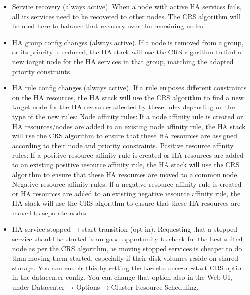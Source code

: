 \begin{itemize}[leftmargin=2cm]

	\item Service recovery (always active). When a node with active HA services fails, all its services need to be recovered to other nodes. The CRS algorithm will be used here to balance that recovery over the remaining nodes.

	\item HA group config changes (always active). If a node is removed from a group, or its priority is reduced, the HA stack will use the CRS algorithm to find a new target node for the HA services in that group, matching the adapted priority constraints.

	\item HA rule config changes (always active). If a rule emposes different constraints on the HA resources, the HA stack will use the CRS algorithm to find a new target node for the HA resources affected by these rules depending on the type of the new rules: Node affinity rules: If a node affinity rule is created or HA resources/nodes are added to an existing node affinity rule, the HA stack will use the CRS algorithm to ensure that these HA resources are assigned according to their node and priority constraints. Positive resource affinity rules: If a positive resource affinity rule is created or HA resources are added to an existing positive resource affinity rule, the HA stack will use the CRS algorithm to ensure that these HA resources are moved to a common node. Negative resource affinity rules: If a negative resource affinity rule is created or HA resources are added to an existing negative resource affinity rule, the HA stack will use the CRS algorithm to ensure that these HA resources are moved to separate nodes.

	\item HA service stopped → start transition (opt-in). Requesting that a stopped service should be started is an good opportunity to check for the best suited node as per the CRS algorithm, as moving stopped services is cheaper to do than moving them started, especially if their disk volumes reside on shared storage. You can enable this by setting the ha-rebalance-on-start CRS option in the datacenter config. You can change that option also in the Web UI, under Datacenter → Options → Cluster Resource Scheduling.

\end{itemize}

